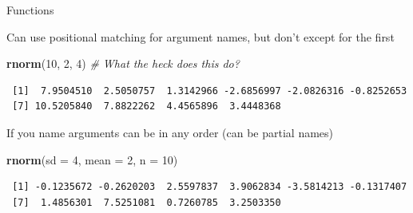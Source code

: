 \documentclass[10pt,ignorenonframetext,compress, aspectratio=169]{beamer}
\newenvironment{Shaded}{\begin{snugshade}}{\end{snugshade}}
\newcommand{\KeywordTok}[1]{\textcolor[rgb]{0.13,0.29,0.53}{\textbf{{#1}}}}
\newcommand{\DataTypeTok}[1]{\textcolor[rgb]{0.13,0.29,0.53}{{#1}}}
\newcommand{\DecValTok}[1]{\textcolor[rgb]{0.00,0.00,0.81}{{#1}}}
\newcommand{\CommentTok}[1]{\textcolor[rgb]{0.56,0.35,0.01}{\textit{{#1}}}}
\newcommand{\NormalTok}[1]{{#1}}
\begin{document}
\begin{frame}[fragile]{Functions}

Can use \alert{positional} matching for argument names, but don't except
for the first

\scriptsize

\begin{Shaded}
\begin{Highlighting}[]
\KeywordTok{rnorm}\NormalTok{(}\DecValTok{10}\NormalTok{, }\DecValTok{2}\NormalTok{, }\DecValTok{4}\NormalTok{)                         }\CommentTok{# What the heck does this do?}
\end{Highlighting}
\end{Shaded}

\begin{verbatim}
 [1]  7.9504510  2.5050757  1.3142966 -2.6856997 -2.0826316 -0.8252653
 [7] 10.5205840  7.8822262  4.4565896  3.4448368
\end{verbatim}

\normalsize

If you name arguments can be in any order (can be partial names)

\scriptsize

\begin{Shaded}
\begin{Highlighting}[]
\KeywordTok{rnorm}\NormalTok{(}\DataTypeTok{sd =} \DecValTok{4}\NormalTok{, }\DataTypeTok{mean =} \DecValTok{2}\NormalTok{, }\DataTypeTok{n =} \DecValTok{10}\NormalTok{)}
\end{Highlighting}
\end{Shaded}

\begin{verbatim}
 [1] -0.1235672 -0.2620203  2.5597837  3.9062834 -3.5814213 -0.1317407
 [7]  1.4856301  7.5251081  0.7260785  3.2503350
\end{verbatim}

\normalsize

\end{frame}
\end{document}
